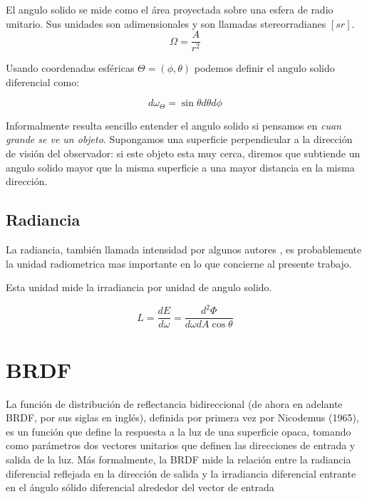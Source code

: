 El angulo solido se mide como el área proyectada sobre una esfera de radio unitario. Sus unidades son adimensionales y son llamadas stereorradianes $[sr]$.
\begin{equation}
\Omega = \frac{A}{r^2}
\end{equation}


Usando coordenadas esféricas $\Theta = (\phi , \theta )$ podemos definir el angulo solido diferencial como:

\begin{equation}
d \omega _ \Theta = \sin \theta d \theta d \phi
\end{equation}

Informalmente resulta sencillo entender el angulo solido si pensamos en \emph{cuan grande se ve un objeto}. Supongamos una superficie perpendicular a la dirección de visión del observador: si este objeto esta muy cerca, diremos que subtiende un angulo solido mayor que la misma superficie a una mayor distancia en la misma dirección.

\clearpage

\subsection{Radiancia}

La radiancia, también llamada intensidad por algunos autores \cite{Kajiya1986, Immel1986}, es probablemente la unidad radiometrica mas importante en lo que concierne al presente trabajo.

Esta unidad mide la irradiancia por unidad de angulo solido.

\begin{equation}
L = \frac{dE}{d\omega} = \frac{d^2\Phi}{d\omega dA\cos \theta} 
\end{equation}


\clearpage

\section{BRDF}

La función de distribución de reflectancia bidireccional (de ahora en adelante BRDF, por sus siglas en inglés), definida por primera vez por \cite{Nicodemus1965} Nicodemus (1965), es un función que define la respuesta a la luz de una superficie opaca, tomando como parámetros dos vectores unitarios que definen las direcciones de entrada y salida de la luz. Más formalmente, la BRDF mide la relación entre la radiancia diferencial reflejada en la dirección de salida y la irradiancia diferencial entrante en el ángulo sólido diferencial alrededor del vector de entrada

